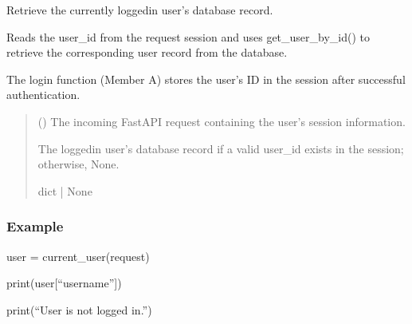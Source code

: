 \documentclass[letterpaper,10pt,english]{sphinxmanual}
\begin{document}
\begin{fulllineitems}
\label{\detokenize{modules:app.utils.current_user}}
\pysigstartsignatures
\pysiglinewithargsret
{}
{}
{}
\pysigstopsignatures
\sphinxAtStartPar
Retrieve the currently logged\sphinxhyphen{}in user’s database record.

\sphinxAtStartPar
Reads the user\_id from the request session and uses get\_user\_by\_id()
to retrieve the corresponding user record from the database.

\sphinxAtStartPar
The login function (Member A) stores the user’s ID in the session
after successful authentication.
\begin{quote}\begin{description}
\sphinxAtStartPar
{} () \textendash{} The incoming FastAPI request containing
the user’s session information.

\sphinxAtStartPar
The logged\sphinxhyphen{}in user’s database record if a valid
user\_id exists in the session; otherwise, None.

\sphinxAtStartPar
dict | None

\end{description}\end{quote}
\subsubsection*{Example}

\sphinxAtStartPar
user = current\_user(request)
\begin{description}
\sphinxAtStartPar
print(user{[}“username”{]})

\sphinxAtStartPar
print(“User is not logged in.”)

\end{description}

\end{fulllineitems}

\end{document}
